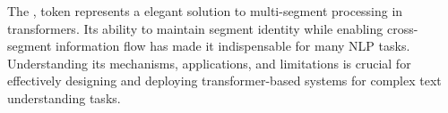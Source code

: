 




The \sep{} token represents a elegant solution to multi-segment processing in transformers. Its ability to maintain segment identity while enabling cross-segment information flow has made it indispensable for many NLP tasks. Understanding its mechanisms, applications, and limitations is crucial for effectively designing and deploying transformer-based systems for complex text understanding tasks.